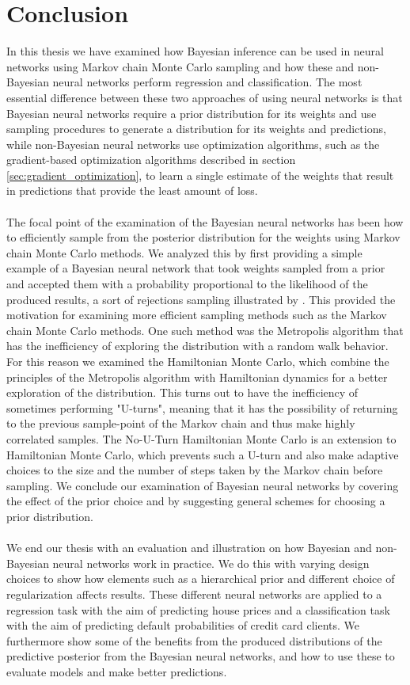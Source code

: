 \chapter{Conclusion}
In this thesis we have examined how Bayesian inference can be used in neural networks using Markov chain Monte Carlo sampling and how these and non-Bayesian neural networks perform regression and classification. The most essential difference between these two approaches of using neural networks is that Bayesian neural networks require a prior distribution for its weights and use sampling procedures to generate a distribution for its weights and predictions, while non-Bayesian neural networks use optimization algorithms, such as the gradient-based optimization algorithms described in section \ref{sec:gradient_optimization}, to learn a single estimate of the weights that result in predictions that provide the least amount of loss. 
\\
\\
The focal point of the examination of the Bayesian neural networks has been how to efficiently sample from the posterior distribution for the weights using Markov chain Monte Carlo methods. We analyzed this by first providing a simple example of a Bayesian neural network that took weights sampled from a prior and accepted them with a probability proportional to the likelihood of the produced results, a sort of rejections sampling illustrated by \cite{neal2012bayesian}. This provided the motivation for examining more efficient sampling methods such as the Markov chain Monte Carlo methods. One such method was the Metropolis algorithm that has the inefficiency of exploring the distribution with a random walk behavior. For this reason we examined the Hamiltonian Monte Carlo, which combine the principles of the Metropolis algorithm with Hamiltonian dynamics for a better exploration of the distribution. This turns out to have the inefficiency of sometimes performing "U-turns", meaning that it has the possibility of returning to the previous sample-point of the Markov chain and thus make highly correlated samples. 
The No-U-Turn Hamiltonian Monte Carlo is an extension to Hamiltonian Monte Carlo, which prevents such a U-turn and also make adaptive choices to the size and the number of steps taken by the Markov chain before sampling. We conclude our examination of Bayesian neural networks by covering the effect of the prior choice and by suggesting general schemes for choosing a prior distribution.
\\
\\
We end our thesis with an evaluation and illustration on how Bayesian and non-Bayesian neural networks work in practice. We do this with varying design choices to show how elements such as a hierarchical prior and different choice of regularization affects results. These different neural networks are applied to a regression task with the aim of predicting house prices and a classification task with the aim of predicting default probabilities of credit card clients. We furthermore show some of the benefits from the produced distributions of the predictive posterior from the Bayesian neural networks, and how to use these to evaluate models and make better predictions.
